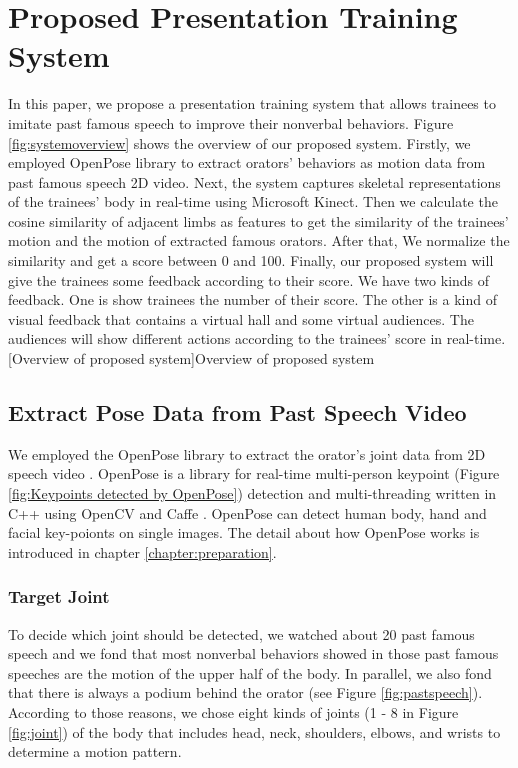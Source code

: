 \chapter{Proposed Presentation Training System}

\par In this paper, we propose a presentation training system that allows trainees to imitate past famous speech to improve their nonverbal behaviors. Figure \ref{fig:systemoverview} shows the overview of our proposed system. Firstly, we employed OpenPose library \cite{cao2017realtime} to extract orators' behaviors as motion data from past famous speech 2D video. Next, the system captures skeletal representations of the trainees' body in real-time using Microsoft Kinect. Then we calculate the cosine similarity of adjacent limbs as features to get the similarity of the trainees' motion and the motion of extracted famous orators. After that, We normalize the similarity and get a score between 0 and 100. Finally, our proposed system will give the trainees some feedback according to their score. We have two kinds of feedback. One is show trainees the number of their score. The other is a kind of visual feedback that contains a virtual hall and some virtual audiences. The audiences will show different actions according to the trainees' score in real-time. 
[Overview of proposed system]{Overview of proposed system}

\par\section{Extract Pose Data from Past Speech Video}

\par We employed the OpenPose library to extract the orator's joint data from 2D speech video \cite{cao2017realtime}. OpenPose is a library for real-time multi-person keypoint (Figure \ref{fig:Keypoints detected by OpenPose}) detection and multi-threading written in C++ using OpenCV and Caffe \cite{Jia2014}. OpenPose can detect human body, hand and facial key-poionts on single images. The detail about how OpenPose works is introduced in chapter \ref{chapter:preparation}.

\subsection*{Target Joint}

\par To decide which joint should be detected, we watched about 20 past famous speech and we fond that most nonverbal behaviors showed in those past famous speeches are the motion of the upper half of the body. In parallel, we also fond that there is always a podium behind the orator (see Figure \ref{fig:pastspeech}). According to those reasons, we chose eight kinds of joints (1 - 8 in Figure \ref{fig:joint}) of the body that includes head, neck, shoulders, elbows, and wrists to determine a motion pattern.


